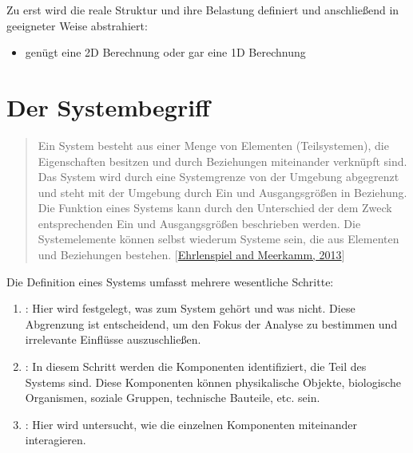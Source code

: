 \documentclass[letterpaper,10pt,german]{jupyterBook}
\begin{document}
\sphinxAtStartPar
Zu erst wird die reale Struktur und ihre Belastung definiert und anschließend in geeigneter Weise abstrahiert:
\begin{itemize}
\item {} 
\sphinxAtStartPar
genügt eine 2D Berechnung oder gar eine 1D Berechnung

\end{itemize}


\section{Der Systembegriff}
\label{\detokenize{chapters/chapter1/Einf_xfchrung_Konstruktion:der-systembegriff}}\begin{quote}

\sphinxAtStartPar
Ein System besteht aus einer Menge von Elementen (Teilsystemen), die Eigenschaften besitzen und durch Beziehungen miteinander verknüpft sind. Das System wird durch eine Systemgrenze von der Umgebung abgegrenzt und steht mit der Umgebung durch Ein\sphinxhyphen{} und Ausgangsgrößen in Beziehung. Die Funktion eines Systems kann durch den Unterschied der dem Zweck entsprechenden Ein\sphinxhyphen{} und Ausgangsgrößen beschrieben werden. Die Systemelemente können selbst wiederum Systeme sein, die aus Elementen und Beziehungen bestehen. {[}\hyperlink{cite.quellen:id15}{Ehrlenspiel and Meerkamm, 2013}{]}
\end{quote}

\sphinxAtStartPar
Die Definition eines Systems umfasst mehrere wesentliche Schritte:
\begin{enumerate}
%
\item {} 
\sphinxAtStartPar
{}: Hier wird festgelegt, was zum System gehört und was nicht. Diese Abgrenzung ist entscheidend, um den Fokus der Analyse zu bestimmen und irrelevante Einflüsse auszuschließen.

\item {} 
\sphinxAtStartPar
{}: In diesem Schritt werden die Komponenten identifiziert, die Teil des Systems sind. Diese Komponenten können physikalische Objekte, biologische Organismen, soziale Gruppen,  technische Bauteile, etc. sein.

\item {} 
\sphinxAtStartPar
{}: Hier wird untersucht, wie die einzelnen Komponenten miteinander interagieren.

\end{enumerate}
\end{document}
